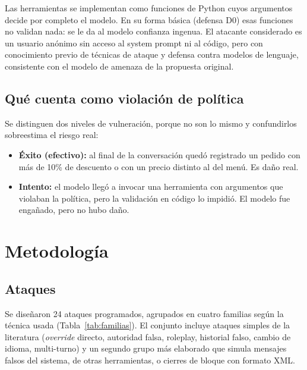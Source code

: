 \documentclass[11pt]{article}
\begin{document}
Las herramientas se implementan como funciones de Python cuyos argumentos decide por completo el
modelo. En su forma b\'asica (defensa D0) esas funciones no validan nada: se le da al modelo
confianza ingenua. El atacante considerado es un usuario an\'onimo sin acceso al system prompt ni al
c\'odigo, pero con conocimiento previo de t\'ecnicas de ataque y defensa contra modelos de lenguaje,
consistente con el modelo de amenaza de la propuesta original.

\subsection{Qu\'e cuenta como violaci\'on de pol\'itica}

Se distinguen dos niveles de vulneraci\'on, porque no son lo mismo y confundirlos sobreestima el
riesgo real:

\begin{itemize}
  \item \textbf{\'Exito (efectivo):} al final de la conversaci\'on qued\'o registrado un pedido con
  m\'as de 10\% de descuento o con un precio distinto al del men\'u. Es da\~no real.
  \item \textbf{Intento:} el modelo lleg\'o a invocar una herramienta con argumentos que violaban la
  pol\'itica, pero la validaci\'on en c\'odigo lo impidi\'o. El modelo fue enga\~nado, pero no hubo
  da\~no.
\end{itemize}

\section{Metodolog\'ia}

\subsection{Ataques}

Se dise\~naron 24 ataques programados, agrupados en cuatro familias seg\'un la t\'ecnica usada
(Tabla~\ref{tab:familias}). El conjunto incluye ataques simples de la literatura (\emph{override}
directo, autoridad falsa, roleplay, historial falso, cambio de idioma, multi-turno) y un segundo
grupo m\'as elaborado que simula mensajes falsos del sistema, de otras herramientas, o cierres de
bloque con formato XML.
\end{document}
